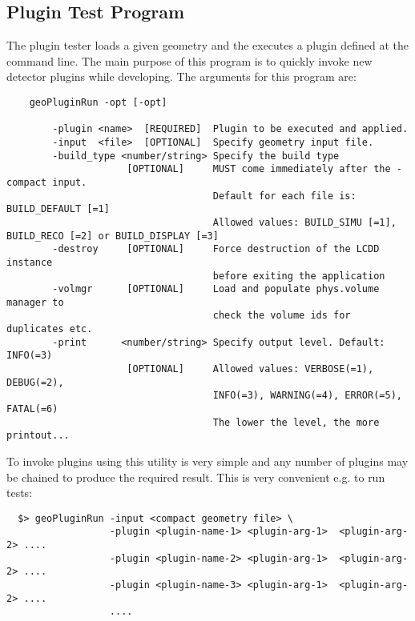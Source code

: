 \subsection{Plugin Test Program}
\label{sec:dd4hep-manual-plugin-test}

The plugin tester loads a given geometry and the executes a plugin defined at the command line. The main purpose of this program is to quickly  invoke new detector plugins while developing. The arguments for this  program are:
\begin{verbatim}
    geoPluginRun -opt [-opt]                                                
    
        -plugin <name>  [REQUIRED]  Plugin to be executed and applied.        
        -input  <file>  [OPTIONAL]  Specify geometry input file.              
        -build_type <number/string> Specify the build type                         
                     [OPTIONAL]     MUST come immediately after the -compact input.
                                    Default for each file is: BUILD_DEFAULT [=1]   
                                    Allowed values: BUILD_SIMU [=1], BUILD_RECO [=2] or BUILD_DISPLAY [=3]
        -destroy     [OPTIONAL]     Force destruction of the LCDD instance         
                                    before exiting the application                 
        -volmgr      [OPTIONAL]     Load and populate phys.volume manager to       
                                    check the volume ids for duplicates etc.       
        -print      <number/string> Specify output level. Default: INFO(=3)        
                     [OPTIONAL]     Allowed values: VERBOSE(=1), DEBUG(=2),        
                                    INFO(=3), WARNING(=4), ERROR(=5), FATAL(=6)    
                                    The lower the level, the more printout...
\end{verbatim}
To invoke plugins using this utility is very simple and any number of plugins may be chained
to produce the required result. This is very convenient e.g. to run tests:
\begin{verbatim}
  $> geoPluginRun -input <compact geometry file> \
                  -plugin <plugin-name-1> <plugin-arg-1>  <plugin-arg-2> ....
                  -plugin <plugin-name-2> <plugin-arg-1>  <plugin-arg-2> ....
                  -plugin <plugin-name-3> <plugin-arg-1>  <plugin-arg-2> ....
                  ....
\end{verbatim}

